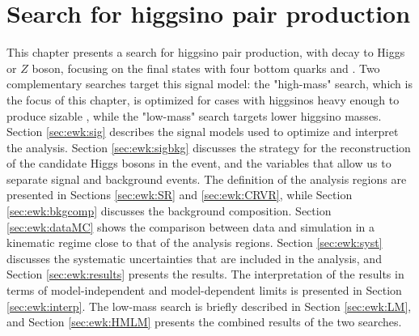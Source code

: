 \chapter{Search for higgsino pair production}
\label{chap:ewk_prod}

This chapter presents a search for higgsino pair production, with decay to Higgs or $Z$ boson, 
focusing on the final states with four bottom quarks and \met. 
Two complementary searches target this signal model: the "high-mass" search,
which is the focus of this chapter, is optimized for 
cases with higgsinos heavy enough to produce sizable \met, while the "low-mass" search 
targets lower higgsino masses.
Section \ref{sec:ewk:sig} describes the signal models used to optimize and interpret the analysis. 
Section \ref{sec:ewk:sigbkg} discusses the strategy for the reconstruction of the candidate Higgs bosons in the event, 
and the variables that allow us to separate signal and background events. 
The definition of the analysis regions are presented in Sections \ref{sec:ewk:SR} and 
\ref{sec:ewk:CRVR}, 
while Section \ref{sec:ewk:bkgcomp} discusses the background composition. 
Section \ref{sec:ewk:dataMC} shows the comparison between data and simulation in a kinematic regime close to that of the analysis regions. 
Section \ref{sec:ewk:syst} discusses the systematic uncertainties that are included in the analysis, and Section \ref{sec:ewk:results} 
presents the results. 
The interpretation of the results in terms of model-independent and model-dependent limits is presented in Section \ref{sec:ewk:interp}. 
The low-mass search is briefly described in Section \ref{sec:ewk:LM}, and Section \ref{sec:ewk:HMLM}  
presents the combined results of the two searches. 









